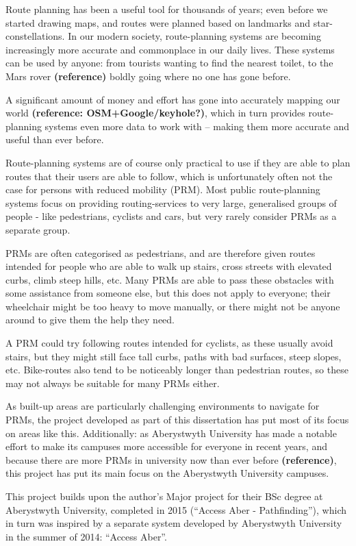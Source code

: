 Route planning has been a useful tool for thousands of years; even before we started drawing maps, and routes were planned based on landmarks and star-constellations. In our modern society, route-planning systems are becoming increasingly more accurate and commonplace in our daily lives. These systems can be used by anyone: from tourists wanting to find the nearest toilet, to the Mars rover \textbf{(reference)} boldly going where no one has gone before.

A significant amount of money and effort has gone into accurately mapping our world \textbf{(reference: OSM+Google/keyhole?)}, which in turn provides route-planning systems even more data to work with -- making them more accurate and useful than ever before.

Route-planning systems are of course only practical to use if they are able to plan routes that their users are able to follow, which is unfortunately often not the case for persons with reduced mobility (PRM). Most public route-planning systems focus on providing routing-services to very large, generalised groups of people - like pedestrians, cyclists and cars, but very rarely consider PRMs as a separate group.

PRMs are often categorised as pedestrians, and are therefore given routes intended for people who are able to walk up stairs, cross streets with elevated curbs, climb steep hills, etc. Many PRMs are able to pass these obstacles with some assistance from someone else, but this does not apply to everyone; their wheelchair might be too heavy to move manually, or there might not be anyone around to give them the help they need.

A PRM could try following routes intended for cyclists, as these usually avoid stairs, but they might still face tall curbs, paths with bad surfaces, steep slopes, etc. Bike-routes also tend to be noticeably longer than pedestrian routes, so these may not always be suitable for many PRMs either.

As built-up areas are particularly challenging environments to navigate for PRMs, the project developed as part of this dissertation has put most of its focus on areas like this. Additionally: as Aberystwyth University has made a notable effort to make its campuses more accessible for everyone in recent years, and because there are more PRMs in university now than ever before \textbf{(reference)}, this project has put its main focus on the Aberystwyth University campuses.

This project builds upon the author's Major project for their BSc degree at Aberystwyth University, completed in 2015 (\textquotedblleft Access Aber - Pathfinding\textquotedblright), which in turn was inspired by a separate system developed by Aberystwyth University in the summer of 2014: \textquotedblleft Access Aber\textquotedblright .

